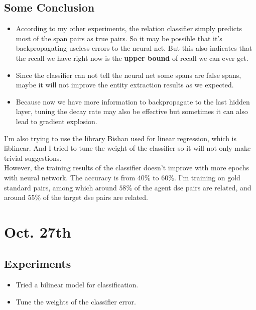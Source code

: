 \documentclass[a4paper, 12pt]{article}
\begin{document}
 \subsection{Some Conclusion}
 \begin{itemize}
\item
  According to my other experiments, the relation classifier simply predicts most
  of the span pairs as true pairs. So it may be possible that it's backpropagating
  useless errors to the neural net. But this also indicates that the recall we
  have right now is the \textbf{upper bound} of recall we can ever get.\\

\item
  Since the classifier can not tell the neural net some spans are false spans,
  maybe it will not improve the entity extraction results as we expected. \\

\item
  Because now we have more information to backpropagate to the last hidden
  layer, tuning the decay rate may also be effective but sometimes it can also
  lead to gradient explosion.
 \end{itemize}
  I'm also trying to use the library Bishan used for linear regression, which is 
  liblinear. And I tried to tune the weight of the classifier so it will not
  only make trivial suggestions.\\
  However, the training results of the classifier doesn't improve with more
  epochs with neural network. The accuracy is from $40\%$ to $60\%$. I'm
  training on gold standard pairs, among which around $58\%$ of the agent dse pairs are
  related, and around $55\%$ of the target dse pairs are related.\\

\section{Oct. 27th}

\subsection{Experiments}
\begin{itemize}
  \item Tried a bilinear model for classification.
  \item Tune the weights of the classifier error.
\end{itemize}
\end{document}
